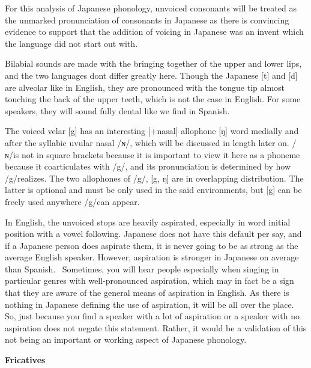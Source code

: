 \par{ For this analysis of Japanese phonology, unvoiced consonants will be treated as the unmarked pronunciation of consonants in Japanese as there is convincing evidence to support that the addition of voicing in Japanese was an invent which the language did not start out with. }

\par{ Bilabial sounds are made with the bringing together of the upper and lower lips, and the two languages don\textquotesingle t differ greatly here. Though the Japanese [t] and [d] are alveolar like in English, they are pronounced with the tongue tip almost touching the back of the upper teeth, which is not the case in English. For some speakers, they will sound fully dental like we find in Spanish. }

\par{ The voiced velar [g] has an interesting [+nasal] allophone [ŋ] word medially and after the syllabic uvular nasal \slash ɴ\slash , which will be discussed in length later on. \slash ɴ\slash  is not in square brackets because it is important to view it here as a phoneme because it coarticulates with \slash g\slash , and its pronunciation is determined by how \slash g\slash  realizes. The two allophones of \slash g\slash , [g, ŋ] are in overlapping distribution. The latter is optional and must be only used in the said environments, but [g] can be freely used anywhere \slash g\slash  can appear. }

\par{ In English, the unvoiced stops are heavily aspirated, especially in word initial position with a vowel following. Japanese does not have this default per say, and if a Japanese person does aspirate them, it is never going to be as strong as the average English speaker. However, aspiration is stronger in Japanese on average than Spanish.  Sometimes, you will hear people especially when singing in particular genres with well-pronounced aspiration, which may in fact be a sign that they are aware of the general means of aspiration in English. As there is nothing in Japanese defining the use of aspiration, it will be all over the place. So, just because you find a speaker with a lot of aspiration or a speaker with no aspiration does not negate this statement. Rather, it would be a validation of this not being an important or working aspect of Japanese phonology. }

\begin{center}
\textbf{Fricatives }
\end{center}

